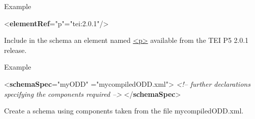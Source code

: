 \begin{reflist}
    \item[{Example}]
  \leavevmode\bgroup{}\exampleFont \begin{shaded}\noindent\mbox{}{<\textbf{elementRef}\hspace*{1em}{key}="{p}"\hspace*{1em}{source}="{tei:2.0.1}"/>}\end{shaded}\egroup 

Include in the schema an element named \hyperref[TEI.p]{<p>} available from the TEI P5 2.0.1 release.
    \item[{Example}]
  \leavevmode\bgroup{}\exampleFont \begin{shaded}\noindent\mbox{}{<\textbf{schemaSpec}\hspace*{1em}{ident}="{myODD}"\mbox{}\newline 
\hspace*{1em}{source}="{mycompiledODD.xml}">}\mbox{}\newline 
\textit{<!-- further declarations specifying the components required -->}\mbox{}\newline 
{</\textbf{schemaSpec}>}\end{shaded}\egroup 

Create a schema using components taken from the file \textsf{mycompiledODD.xml}.
\end{reflist}  

